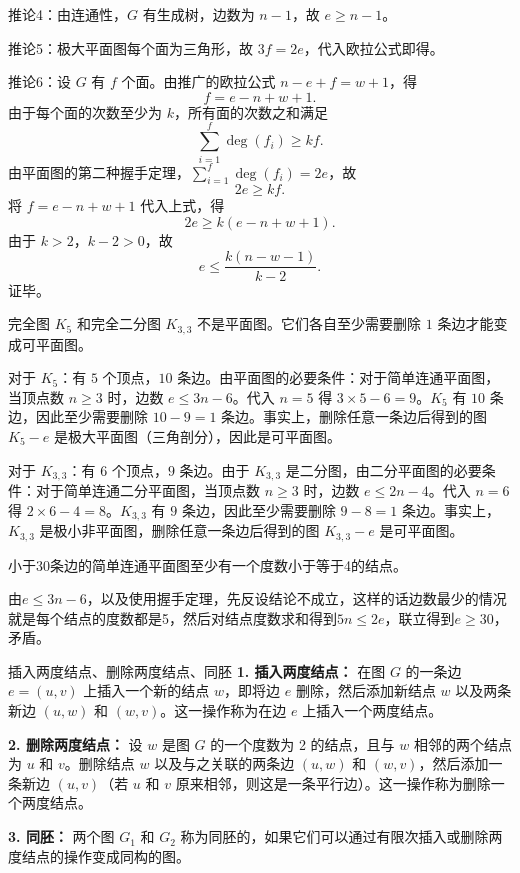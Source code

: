 \documentclass[lang=cn,11pt]{elegantbook}
\begin{document}
推论4：由连通性，$G$ 有生成树，边数为 $n-1$，故 $e \geqslant n-1$。

推论5：极大平面图每个面为三角形，故 $3f=2e$，代入欧拉公式即得。

推论6：设 $G$ 有 $f$ 个面。由推广的欧拉公式 $n - e + f = w + 1$，得
    \[
    f = e - n + w + 1.
    \]
    由于每个面的次数至少为 $k$，所有面的次数之和满足
    \[
    \sum_{i=1}^{f} \deg(f_i) \ge k f.
    \]
    由平面图的第二种握手定理，$\sum_{i=1}^{f} \deg(f_i) = 2e$，故
    \[
    2e \ge k f.
    \]
    将 $f = e - n + w + 1$ 代入上式，得
    \[
    2e \ge k (e - n + w + 1).
    \]
    由于 $k>2$，$k-2 > 0$，故
    \[
    e \le \frac{k(n - w - 1)}{k-2}.
    \]
    证毕。
\begin{example}
    完全图 $K_5$ 和完全二分图 $K_{3,3}$ 不是平面图。它们各自至少需要删除 $1$ 条边才能变成可平面图。
\end{example}
对于 $K_5$：有 $5$ 个顶点，$10$ 条边。由平面图的必要条件：对于简单连通平面图，当顶点数 $n \geqslant 3$ 时，边数 $e \leqslant 3n-6$。代入 $n=5$ 得 $3 \times 5 - 6 = 9$。$K_5$ 有 $10$ 条边，因此至少需要删除 $10-9=1$ 条边。事实上，删除任意一条边后得到的图 $K_5 - e$ 是极大平面图（三角剖分），因此是可平面图。

对于 $K_{3,3}$：有 $6$ 个顶点，$9$ 条边。由于 $K_{3,3}$ 是二分图，由二分平面图的必要条件：对于简单连通二分平面图，当顶点数 $n \geqslant 3$ 时，边数 $e \leqslant 2n-4$。代入 $n=6$ 得 $2 \times 6 - 4 = 8$。$K_{3,3}$ 有 $9$ 条边，因此至少需要删除 $9-8=1$ 条边。事实上，$K_{3,3}$ 是极小非平面图，删除任意一条边后得到的图 $K_{3,3} - e$ 是可平面图。

\begin{example}
    小于30条边的简单连通平面图至少有一个度数小于等于4的结点。
\end{example}
由$e\leqslant 3n-6$，以及使用握手定理，先反设结论不成立，这样的话边数最少的情况就是每个结点的度数都是5，然后对结点度数求和得到$5n\leqslant 2e$，联立得到$e\geqslant 30$，矛盾。

\begin{definition}{插入两度结点、删除两度结点、同胚}
\textbf{1. 插入两度结点：}
在图 $G$ 的一条边 $e = (u, v)$ 上插入一个新的结点 $w$，即将边 $e$ 删除，然后添加新结点 $w$ 以及两条新边 $(u, w)$ 和 $(w, v)$。这一操作称为在边 $e$ 上插入一个两度结点。

\textbf{2. 删除两度结点：}
设 $w$ 是图 $G$ 的一个度数为 2 的结点，且与 $w$ 相邻的两个结点为 $u$ 和 $v$。删除结点 $w$ 以及与之关联的两条边 $(u, w)$ 和 $(w, v)$，然后添加一条新边 $(u, v)$（若 $u$ 和 $v$ 原来相邻，则这是一条平行边）。这一操作称为删除一个两度结点。

\textbf{3. 同胚：}
两个图 $G_1$ 和 $G_2$ 称为同胚的，如果它们可以通过有限次插入或删除两度结点的操作变成同构的图。
\end{definition}
\end{document}
